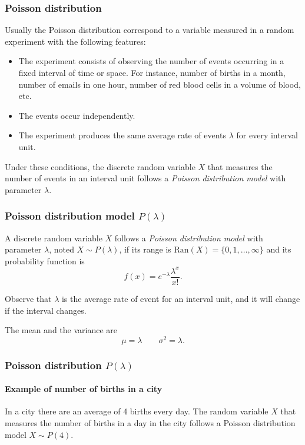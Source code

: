 \begin{frame}
\frametitle{Poisson distribution}
Usually the Poisson distribution correspond to a variable measured in a random experiment with the following features:
\begin{itemize}
\item The experiment consists of observing the number of events occurring in a fixed interval of time or space.
For instance, number of births in a month, number of emails in one hour, number of red blood cells in a volume of
blood, etc. 
\item The events occur independently.
\item The experiment produces the same average rate of events $\lambda$ for every interval unit. 
\end{itemize}
Under these conditions, the discrete random variable $X$ that measures the number of events in an interval unit follows
a \emph{Poisson distribution model} with parameter $\lambda$.
\end{frame}


\begin{frame}
\frametitle{Poisson distribution model $P(\lambda)$}
\begin{definition}
A discrete random variable $X$ follows a \emph{Poisson distribution model} with parameter $\lambda$, noted 
$X\sim P(\lambda)$, if its range is $\mbox{Ran}(X) = \{0,1,\ldots,\infty\}$ and its probability function is
\[
f(x) = e^{-\lambda}\frac{\lambda^x}{x!}.
\]
\end{definition}

Observe that $\lambda$ is the average rate of event for an interval unit, and it will change if the interval changes.

The mean and the variance are
\[
\mu = \lambda \qquad \sigma^2 = \lambda.
\]
\end{frame}


\begin{frame}
\frametitle{Poisson distribution $P(\lambda)$}
\framesubtitle{Example of number of births in a city}
In a city there are an average of 4 births every day. 
The random variable $X$ that measures the number of births in a day in the city follows a Poisson distribution model
$X\sim P(4)$.
\begin{center}
\end{center}
\end{frame}


